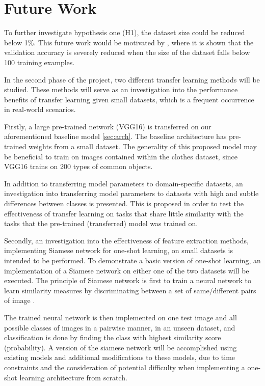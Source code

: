 \documentclass{article}
\begin{document}
\section{Future Work}
\label{sec:future}

To further investigate hypothesis one (H1), the dataset size could be reduced below 1\%. This future work would be motivated by \cite{cho2015much}, where it is shown that the validation accuracy is severely reduced when the size of the dataset falls below 100 training examples.

In the second phase of the project, two different transfer learning methods will be studied. These methods will serve as an investigation into the performance benefits of transfer learning given small datasets, which is a frequent occurrence in real-world scenarios.

Firstly, a large pre-trained network (VGG16) \cite{DBLP:journals/corr/SimonyanZ14a} is transferred on our aforementioned baseline model \ref{sec:arch}. The baseline architecture has pre-trained weights from a small dataset. The generality of this proposed model may be beneficial to train on images contained within the clothes dataset, since VGG16 trains on 200 types of common objects. 

In addition to transferring model parameters to domain-specific datasets, an investigation into transferring model parameters to datasets with high and subtle differences between classes is presented. This is proposed in order to test the effectiveness of transfer learning on tasks that share little similarity with the tasks that the pre-trained (transferred) model was trained on.

Secondly, an investigation into the effectiveness of feature extraction methods, implementing Siamese network for one-shot learning, on small datasets is intended to be performed. To demonstrate a basic version of one-shot learning, an implementation of a Siamese network \cite{bromley1994signature} on either one of the two datasets will be executed. The principle of Siamese network is first to train a neural network to learn similarity measures by discriminating between a set of same/different pairs of image \cite{koch}. 

The trained neural network is then implemented on one test image and all possible classes of images in a pairwise manner, in an unseen dataset, and classification is done by finding the class with highest similarity score (probability).   A version of the siamese network will be accomplished using existing models and additional modifications to these models, due to time constraints and the consideration of potential difficulty when implementing a one-shot learning architecture from scratch.
\end{document}
